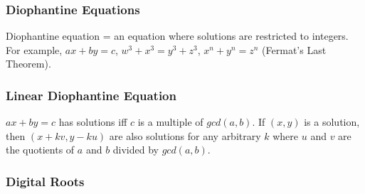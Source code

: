 \documentclass[12pt]{extarticle}
\begin{document}
\subsubsection*{Diophantine Equations}
Diophantine equation = an equation where solutions are restricted to integers. For example, $ax+by=c$, $w^{3}+x^{3}=y^{3}+z^{3}$, $x^{n}+y^{n}=z^{n}$ (Fermat's Last Theorem).
\subsubsection*{Linear Diophantine Equation}
$ax+by=c$ has solutions iff $c$ is a multiple of $gcd(a,b)$. If $(x,y)$ is a solution, then $(x+kv, y-ku)$ are also solutions for any arbitrary $k$ where $u$ and $v$ are the quotients of $a$ and $b$ divided by $gcd(a,b)$.
\subsubsection*{Digital Roots}
\end{document}
